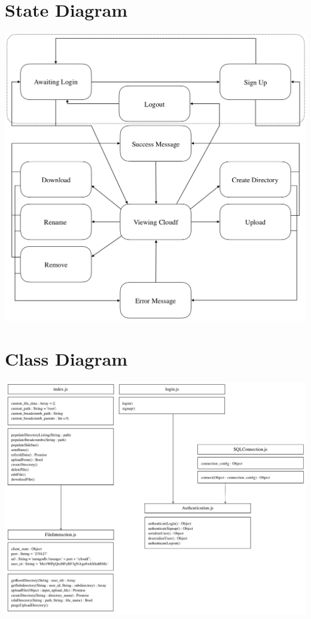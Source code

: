 \documentclass[12pt]{report}
\begin{document}
%
%
\section*{State Diagram}
\begin{center}
    \includegraphics[width=1\textwidth]{images/state_diagram.png}
\end{center}

%
%
\section*{Class Diagram}
\begin{center}
    \includegraphics[width=1\textwidth]{images/class-diagram.png}
\end{center}

\pagebreak
\end{document}
